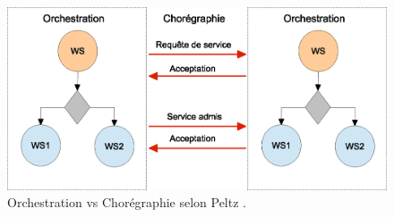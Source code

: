 \begin{figure}[h]
    \centering
    \includegraphics[width=1\textwidth]{figs/orchestration-vs-choregraphie.eps}
    \caption{Orchestration vs Chorégraphie selon Peltz
      \cite{peltz2003web}.}
    \label{fig:orchestration-vs-choregraphie}
\end{figure}